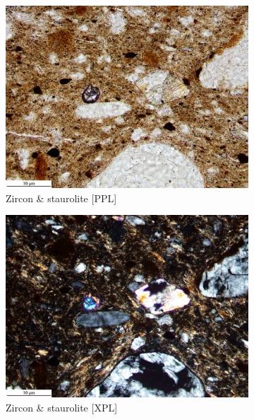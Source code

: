 \documentclass[a4paper]{article}
\begin{document}
\begin{figure}[H]
\begin{subfigure}[t]{.49\textwidth}
		\includegraphics[width=\textwidth]{ThinSections/11-8_20x_PPL.jpg}
		\caption{Zircon \& staurolite [PPL]}
	\end{subfigure}\hspace{.5em}\hfill
	\begin{subfigure}[t]{.49\textwidth}
		\includegraphics[width=\textwidth]{ThinSections/11-8_20x_XPL.jpg}
		\caption{Zircon \& staurolite [XPL]}
	\end{subfigure}
	\begin{subfigure}[t]{.32\textwidth}

\end{subfigure}
\end{figure}
\end{document}
